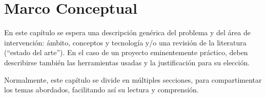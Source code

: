 \chapter{Marco Conceptual}\label{cap:conceptual}

En este capítulo se espera una descripción genérica del problema y del área de intervención: ámbito, conceptos y tecnología y/o una revisión de la literatura (``estado del arte''). En el caso de un proyecto eminentemente práctico, deben describirse también las herramientas usadas y la justificación para su elección.

Normalmente, este capítulo se divide en múltiples secciones, para compartimentar los temas abordados, facilitando así su lectura y comprensión.